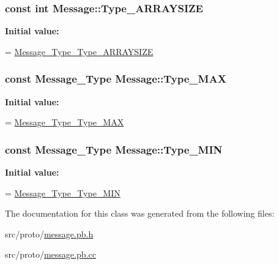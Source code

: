 \subsubsection[{\texorpdfstring{Type\+\_\+\+A\+R\+R\+A\+Y\+S\+I\+ZE}{Type_ARRAYSIZE}}]{\setlength{\rightskip}{0pt plus 5cm}const int Message\+::\+Type\+\_\+\+A\+R\+R\+A\+Y\+S\+I\+ZE\hspace{0.3cm}{\ttfamily [static]}}\hypertarget{class_message_afdad43f1f3fd8af53d430fa57b3c85f9}{}\label{class_message_afdad43f1f3fd8af53d430fa57b3c85f9}
{\bfseries Initial value\+:}
\begin{DoxyCode}
=
    \hyperlink{message_8pb_8h_a67b5ea393c8852bab3714524d9d9d7f3}{Message\_Type\_Type\_ARRAYSIZE}
\end{DoxyCode}
\subsubsection[{\texorpdfstring{Type\+\_\+\+M\+AX}{Type_MAX}}]{\setlength{\rightskip}{0pt plus 5cm}const {\bf Message\+\_\+\+Type} Message\+::\+Type\+\_\+\+M\+AX\hspace{0.3cm}{\ttfamily [static]}}\hypertarget{class_message_aad308e35392d6a12f366c39c06d4dd92}{}\label{class_message_aad308e35392d6a12f366c39c06d4dd92}
{\bfseries Initial value\+:}
\begin{DoxyCode}
=
    \hyperlink{message_8pb_8h_af22d92487ccd5d41b9d4cb8cc7896ded}{Message\_Type\_Type\_MAX}
\end{DoxyCode}
\subsubsection[{\texorpdfstring{Type\+\_\+\+M\+IN}{Type_MIN}}]{\setlength{\rightskip}{0pt plus 5cm}const {\bf Message\+\_\+\+Type} Message\+::\+Type\+\_\+\+M\+IN\hspace{0.3cm}{\ttfamily [static]}}\hypertarget{class_message_a9fc82f92e8d5c8d07f77e60d057a4077}{}\label{class_message_a9fc82f92e8d5c8d07f77e60d057a4077}
{\bfseries Initial value\+:}
\begin{DoxyCode}
=
    \hyperlink{message_8pb_8h_a8894bdaf08226955480cbd6198dac18d}{Message\_Type\_Type\_MIN}
\end{DoxyCode}


The documentation for this class was generated from the following files\+:\begin{DoxyCompactItemize}
\item 
src/proto/\hyperlink{message_8pb_8h}{message.\+pb.\+h}\item 
src/proto/\hyperlink{message_8pb_8cc}{message.\+pb.\+cc}\end{DoxyCompactItemize}

